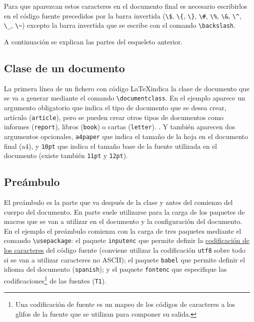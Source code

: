 \documentclass[
  a4paper,
]{scrreport}
\theoremstyle{definition}
\theoremstyle{remark}
\begin{document}
Para que aparezcan estos caracteres en el documento final es necesario
escribirlos en el código fuente precedidos por la barra invertida
(\texttt{\textbackslash{}\$}, \texttt{\textbackslash{}\{},
\texttt{\textbackslash{}\}}, \texttt{\textbackslash{}\#},
\texttt{\textbackslash{}\%}, \texttt{\textbackslash{}\&},
\texttt{\textbackslash{}\^{}}, \texttt{\textbackslash{}\_},
\texttt{\textbackslash{}\textasciitilde{}}) excepto la barra invertida
que se escribe con el comando \texttt{\textbackslash{}backslash}.

A continuación se explican las partes del esqueleto anterior.

\subsection{Clase de un documento}\label{clase-de-un-documento}

La primera línea de un fichero con código \LaTeX indica la clase de
documento que se va a generar mediante el comando
\texttt{\textbackslash{}documentclass}. En el ejemplo aparece un
argumento obligatorio que indica el tipo de documento que se desea
crear, artículo (\texttt{article}), pero se pueden crear otros tipos de
documentos como informes (\texttt{report}), libros (\texttt{book}) o
cartas (\texttt{letter}). . Y también aparecen dos argumentos
opcionales, \texttt{a4paper} que indica el tamaño de la hoja en el
documento final (a4), y \texttt{10pt} que indica el tamaño base de la
fuente utilizada en el documento (existe también \texttt{11pt} y
\texttt{12pt}).

\subsection{Preámbulo}\label{preuxe1mbulo}

El preámbulo es la parte que va después de la clase y antes del comienzo
del cuerpo del documento. En parte suele utilizarse para la carga de los
paquetes de macros que se van a utilizar en el documento y la
configuración del documento. En el ejemplo el preámbulo comienza con la
carga de tres paquetes mediante el comando
\texttt{\textbackslash{}usepackage}: el paquete \texttt{inputenc} que
permite definir la
\href{https://es.wikipedia.org/wiki/Codificaci\%C3\%B3n_de_caracteres}{codificación
de los caracteres} del código fuente (conviene utilizar la codificación
\texttt{utf8} sobre todo si se van a utilizar caracteres no ASCII); el
paquete \texttt{babel} que permite definir el idioma del documento
(\texttt{spanish}); y el paquete \texttt{fontenc} que especifique las
codificaciones\footnote{Una codificación de fuente es un mapeo de los
  códigos de caracteres a los glifos de la fuente que se utilizan para
  componer su salida.} de las fuentes (\texttt{T1}).
\end{document}
